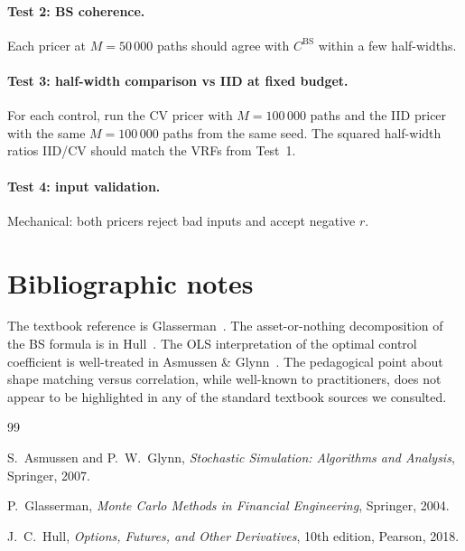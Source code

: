 \documentclass[11pt,a4paper]{article}
\theoremstyle{plain}
\theoremstyle{definition}
\theoremstyle{remark}
\begin{document}
\paragraph{Test 2: BS coherence.} Each pricer at $M = 50\,000$ paths
should agree with $C^{\mathrm{BS}}$ within a few half-widths.

\paragraph{Test 3: half-width comparison vs IID at fixed budget.}
For each control, run the CV pricer with $M = 100\,000$ paths and
the IID pricer with the same $M = 100\,000$ paths from the same
seed. The squared half-width ratios IID/CV should match the VRFs
from Test~1.

\paragraph{Test 4: input validation.} Mechanical: both pricers
reject bad inputs and accept negative $r$.

\section{Bibliographic notes}
\label{sec:biblio}

The textbook reference is Glasserman~\cite[Section~4.1]{Glasserman}.
The asset-or-nothing decomposition of the BS formula is in
Hull~\cite[Chapter~26]{Hull}. The OLS interpretation of the optimal
control coefficient is well-treated in Asmussen \&
Glynn~\cite[Chapter~V]{AsmussenGlynn}. The pedagogical point about
shape matching versus correlation, while well-known to practitioners,
does not appear to be highlighted in any of the standard textbook
sources we consulted.

\begin{thebibliography}{99}

S.\ Asmussen and P.\ W.\ Glynn,
\emph{Stochastic Simulation: Algorithms and Analysis},
Springer, 2007.

P.\ Glasserman,
\emph{Monte Carlo Methods in Financial Engineering},
Springer, 2004.

J.\ C.\ Hull,
\emph{Options, Futures, and Other Derivatives},
10th edition, Pearson, 2018.

\end{thebibliography}
\end{document}
